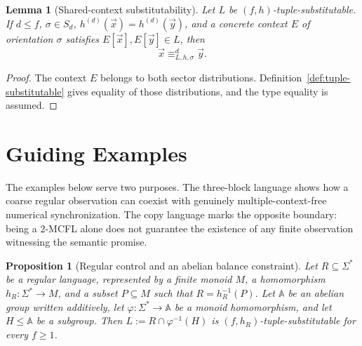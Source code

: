 \documentclass[11pt,a4paper]{article}
\numberwithin{equation}{section}
\theoremstyle{plain}
\newtheorem{lemma}[theorem]{Lemma}
\newtheorem{proposition}[theorem]{Proposition}
\theoremstyle{definition}
\theoremstyle{remark}
\newcommand{\tuple}[1]{\vec{#1}}
\begin{document}
\begin{lemma}[Shared-context substitutability]
\label{lem:shared-context}
Let \(L\) be \((f,h)\)-tuple-substitutable.  If \(d\le f\),
\(\sigma\in S_d\), \(h^{(d)}(\tuple x)=h^{(d)}(\tuple y)\), and a concrete
context \(E\) of orientation \(\sigma\) satisfies
\(E[\tuple x],E[\tuple y]\in L\), then
\[
  \tuple x\equiv_{L,h,\sigma}^d\tuple y.
\]
\end{lemma}

\begin{proof}
The context \(E\) belongs to both sector distributions.  Definition~\ref{def:tuple-substitutable}
gives equality of those distributions, and the type equality is assumed.
\end{proof}



\section{Guiding Examples}
\label{sec:running-examples}

The examples below serve two purposes.  The three-block language shows how a
coarse regular observation can coexist with genuinely multiple-context-free
numerical synchronization.  The copy language marks the opposite boundary:
being a $2$-MCFL alone does not guarantee the existence of any finite
observation witnessing the semantic promise.

\begin{proposition}[Regular control and an abelian balance constraint]
\label{prop:regular-abelian-balance}
Let \(R\subseteq\Sigma^*\) be a regular language, represented by a finite
monoid \(M\), a homomorphism \(h_R\colon\Sigma^*\to M\), and a subset
\(P\subseteq M\) such that \(R=h_R^{-1}(P)\).
Let \(\mathbb A\) be an abelian group written additively,
let \(\varphi\colon\Sigma^*\to\mathbb A\) be a monoid homomorphism, and let
\(H\le\mathbb A\) be a subgroup.
Then
\(L:=R\cap\varphi^{-1}(H)\)
is \((f,h_R)\)-tuple-substitutable for every \(f\ge1\).
\end{proposition}
\end{document}
